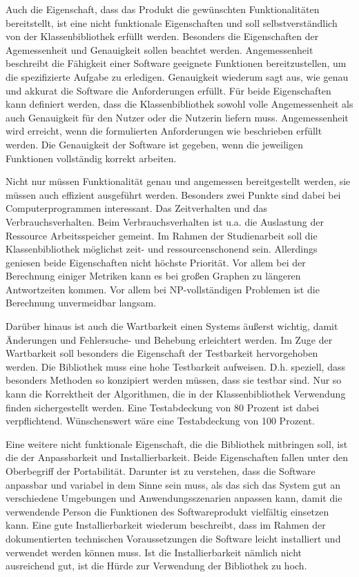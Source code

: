 \documentclass[a4paper,12pt,ngerman,chapterprefix=false,listof=totoc,bibliography=totoc]{scrreprt}
\begin{document}
{{{Auch die Eigenschaft, dass das Produkt die gewünschten Funktionalitäten bereitstellt, ist eine nicht funktionale Eigenschaften und soll selbstverständlich von der Klassenbibliothek erfüllt werden. Besonders die Eigenschaften der Agemessenheit und Genauigkeit sollen beachtet werden. Angemessenheit beschreibt die Fähigkeit einer Software geeignete Funktionen bereitzustellen, um die spezifizierte Aufgabe zu erledigen. Genauigkeit wiederum sagt aus, wie genau und akkurat die Software die Anforderungen erfüllt. Für beide Eigenschaften kann definiert werden, dass die Klassenbibliothek sowohl volle Angemessenheit als auch Genauigkeit für den Nutzer oder die Nutzerin liefern muss. Angemessenheit wird erreicht, wenn die formulierten Anforderungen wie beschrieben erfüllt werden. Die Genauigkeit der Software ist gegeben, wenn die jeweiligen Funktionen vollständig korrekt arbeiten.

Nicht nur müssen Funktionalität genau und angemessen bereitgestellt werden, sie müssen auch effizient ausgeführt werden. Besonders zwei Punkte sind dabei bei Computerprogrammen interessant. Das Zeitverhalten und das Verbrauchsverhalten. Beim Verbrauchsverhalten ist u.a. die Auslastung der Ressource Arbeitsspeicher gemeint. Im Rahmen der Studienarbeit soll die Klassenbibliothek möglichst zeit- und ressourcenschonend sein. Allerdings geniesen beide Eigenschaften nicht höchste Priorität. Vor allem bei der Berechnung einiger Metriken kann es bei großen Graphen zu längeren Antwortzeiten kommen. Vor allem bei NP-vollständigen Problemen ist die Berechnung unvermeidbar langsam.

Darüber hinaus ist auch die Wartbarkeit einen Systems äußerst wichtig, damit Änderungen und Fehlersuche- und Behebung erleichtert werden. Im Zuge der Wartbarkeit soll besonders die Eigenschaft der Testbarkeit hervorgehoben werden. Die Bibliothek muss eine hohe Testbarkeit aufweisen. D.h. speziell, dass besonders Methoden so konzipiert werden müssen, dass sie testbar sind. Nur so kann die Korrektheit der Algorithmen, die in der Klassenbibliothek Verwendung finden sichergestellt werden. Eine Testabdeckung von 80 Prozent ist dabei verpflichtend. Wünschenswert wäre eine Testabdeckung von 100 Prozent.

Eine weitere nicht funktionale Eigenschaft, die die Bibliothek mitbringen soll, ist die der Anpassbarkeit und Installierbarkeit. Beide Eigenschaften fallen unter den Oberbegriff der Portabilität. Darunter ist zu verstehen, dass die Software anpassbar und variabel in dem Sinne sein muss, als das sich das System gut an verschiedene Umgebungen und Anwendungsszenarien anpassen kann, damit die verwendende Person die Funktionen des Softwareprodukt vielfältig einsetzen kann. Eine gute Installierbarkeit wiederum beschreibt, dass im Rahmen der dokumentierten technischen Voraussetzungen die Software leicht installiert und verwendet werden können muss. Ist die Installierbarkeit nämlich nicht ausreichend gut, ist die Hürde zur Verwendung der Bibliothek zu hoch. 
}
}}
\end{document}

